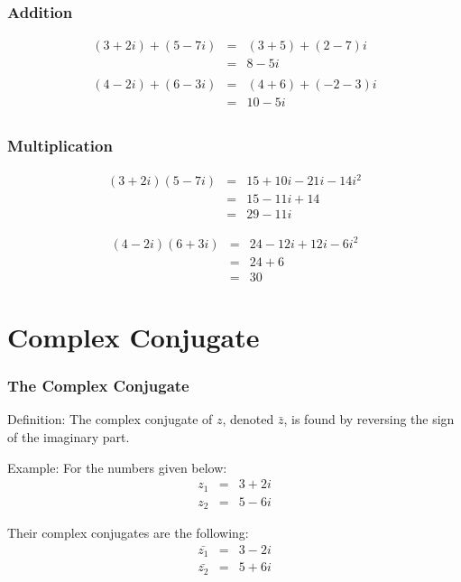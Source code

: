 \begin{frame}
  \frametitle{Addition}

  \begin{eqnarray*}
    (3+2i) + (5-7i) & = & (3+5) + (2-7)i \\
    & = & 8 - 5i\\
    ~ \\
    (4-2i) + (6-3i) & = & (4+6) + (-2-3)i \\
    & = & 10 - 5i \\
  \end{eqnarray*}

\end{frame}

\begin{frame}
  \frametitle{Multiplication}

  \begin{eqnarray*}
    (3+2i)(5-7i) & = & 15 + 10i - 21i - 14 i^2 \\
    & = & 15 - 11i + 14 \\
    & = & 29 - 11 i
  \end{eqnarray*}

  \begin{eqnarray*}
    (4-2i)(6+3i) & = & 24 - 12i + 12 i - 6i^2 \\
    & = & 24 + 6 \\
    & = & 30
  \end{eqnarray*}

\end{frame}


\section{Complex Conjugate}

\begin{frame}
  \frametitle{The Complex Conjugate}

  Definition: The complex conjugate of $z$, denoted $\bar{z}$, is
  found by reversing the sign of the imaginary part.
  
  Example:
  For the numbers given below:
  \begin{eqnarray*}
    z_1 & = & 3 + 2i \\
    z_2 & = & 5 - 6i 
  \end{eqnarray*}

  Their complex conjugates are the following:
  \begin{eqnarray*}
    \bar{z_1} & = & 3 - 2i \\
    \bar{z_2} & = & 5 + 6i 
  \end{eqnarray*}


\end{frame}

